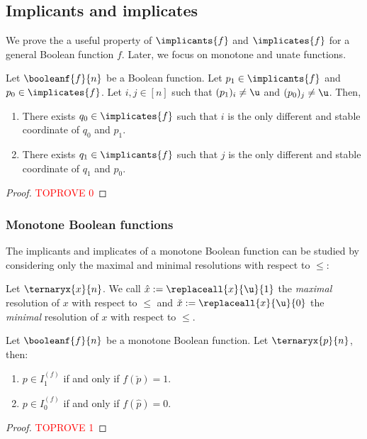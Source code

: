 \documentclass[acmsmall, nonacm, authorversion]{acmart}
\begin{document}
\subsection{Implicants and implicates}\label{sec:implicants}
We prove the a useful property of $\implicants{f}$ and $\implicates{f}$ for a general Boolean function $f$. Later, we focus on monotone and unate functions. 

\begin{proposition}\label{prop:implicant-and-neg-implicate}
Let $\booleanf{f}{n}$ be a Boolean function. Let $p_1\in\implicants{f}$ and $p_0\in \implicates{f}$. Let $i,j\in[n]$ such that $(p_1)_i\neq \u$ and $(p_0)_j\neq \u$. Then,
\begin{enumerate}
    \item There exists $q_0\in\implicates{f}$ such that $i$ is the only different and stable coordinate of $q_0$ and $p_1$.\label{item:implicant-and-neg-implicate-1}
    \item There exists $q_1\in\implicants{f}$ such that $j$ is the only different and stable coordinate of $q_1$ and $p_0$.\label{item:implicant-and-neg-implicate-2}
\end{enumerate} 
\end{proposition}
\begin{proof}\textcolor{red}{TOPROVE 0}\end{proof}

\subsubsection{Monotone Boolean functions}\label{subsec:prime-implicants-monotone}
The implicants and implicates of a monotone Boolean function can be studied by considering only the maximal and minimal resolutions with respect to $\le$:
\begin{definition}\label{def:max-and-min-res}
Let $\ternaryx{x}{n}$. We call $\hat{x}:=\replaceall{x}{\u}{1}$ the \emph{maximal} resolution of $x$ with respect to $\le$ and $\check{x}:=\replaceall{x}{\u}{0}$ the \emph{minimal} resolution of $x$ with respect to $\le$.
\end{definition}

\begin{lemma}\label{lem:implicants-implicates-monotone}
Let $\booleanf{f}{n}$ be a monotone Boolean function. Let $\ternaryx{p}{n}$, then:
\begin{enumerate}
    \item $p\in I_1^{(f)}$ if and only if $f(\check{p})=1$.\label{item:implicants-implicates-monotone-1}
    \item $p\in I_0^{(f)}$ if and only if $f(\hat{p})=0$.\label{item:implicants-implicates-monotone-2}
\end{enumerate}
\end{lemma}
\begin{proof}\textcolor{red}{TOPROVE 1}\end{proof}
\end{document}
